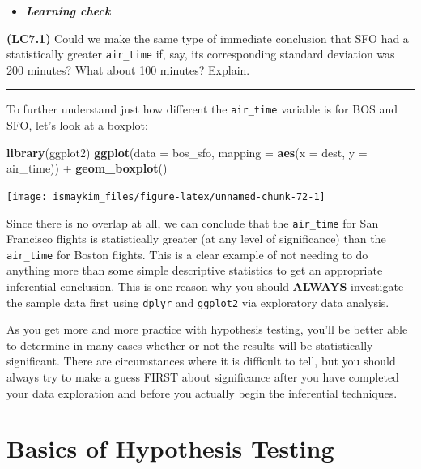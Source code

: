 \documentclass[]{tufte-book}
\newenvironment{Shaded}{\begin{snugshade}}{\end{snugshade}}
\newcommand{\KeywordTok}[1]{\textcolor[rgb]{0.13,0.29,0.53}{\textbf{{#1}}}}
\newcommand{\DataTypeTok}[1]{\textcolor[rgb]{0.13,0.29,0.53}{{#1}}}
\newcommand{\StringTok}[1]{\textcolor[rgb]{0.31,0.60,0.02}{{#1}}}
\newcommand{\NormalTok}[1]{{#1}}
\let\oldrule=\rule
\renewcommand{\rule}[1]{\oldrule{\linewidth}}
\newenvironment{rmdblock}[1]
  {\begin{shaded*}
  \begin{itemize}
  \renewcommand{\labelitemi}{
    \raisebox{-.7\height}[0pt][0pt]{
    }
  }
  \item
  }
  {
  \end{itemize}
  \end{shaded*}
  }
\newenvironment{learncheck}
  {\begin{rmdblock}{warning}}
  {\end{rmdblock}}
\begin{document}
\begin{learncheck}
\textbf{\emph{Learning check}}
\end{learncheck}

\textbf{(LC7.1)} Could we make the same type of immediate conclusion
that SFO had a statistically greater \texttt{air\_time} if, say, its
corresponding standard deviation was 200 minutes? What about 100
minutes? Explain.

\begin{center}\rule{0.5\linewidth}{\linethickness}\end{center}

To further understand just how different the \texttt{air\_time} variable
is for BOS and SFO, let's look at a boxplot:

\begin{Shaded}
\begin{Highlighting}[]
\KeywordTok{library}\NormalTok{(ggplot2)}
\KeywordTok{ggplot}\NormalTok{(}\DataTypeTok{data =} \NormalTok{bos_sfo, }\DataTypeTok{mapping =} \KeywordTok{aes}\NormalTok{(}\DataTypeTok{x =} \NormalTok{dest, }\DataTypeTok{y =} \NormalTok{air_time)) +}
\StringTok{  }\KeywordTok{geom_boxplot}\NormalTok{()}
\end{Highlighting}
\end{Shaded}

\begin{center}\texttt{[image: ismaykim\_files/figure-latex/unnamed-chunk-72-1]} \end{center}

Since there is no overlap at all, we can conclude that the
\texttt{air\_time} for San Francisco flights is statistically greater
(at any level of significance) than the \texttt{air\_time} for Boston
flights. This is a clear example of not needing to do anything more than
some simple descriptive statistics to get an appropriate inferential
conclusion. This is one reason why you should \textbf{ALWAYS}
investigate the sample data first using \texttt{dplyr} and
\texttt{ggplot2} via exploratory data analysis.

As you get more and more practice with hypothesis testing, you'll be
better able to determine in many cases whether or not the results will
be statistically significant. There are circumstances where it is
difficult to tell, but you should always try to make a guess FIRST about
significance after you have completed your data exploration and before
you actually begin the inferential techniques.

\section{Basics of Hypothesis
Testing}\label{basics-of-hypothesis-testing}
\end{document}
